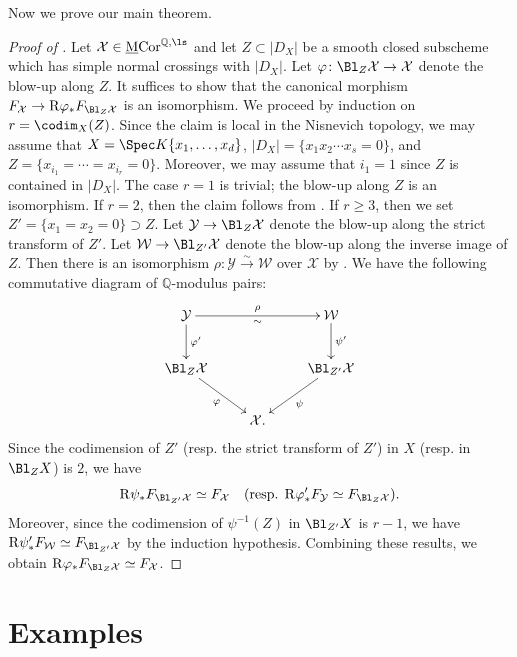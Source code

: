 \documentclass{amsart}
\theoremstyle{plain}
\theoremstyle{definition}
\theoremstyle{remark}
\numberwithin{equation}{section}
\def\MCor{\mathrm{\underline{M}Cor}}
\begin{document}
Now we prove our main theorem.

\begin{proof}[Proof of ]
	Let $\mathcal{X}\in \MCor^{\mathbb{Q},\ls}$ and let $Z\subset|D_X|$ be a smooth closed subscheme which has simple normal crossings with $|D_X|$.
    Let $\varphi\colon \Bl_Z\mathcal{X}\to \mathcal{X}$ denote the blow-up along $Z$.
    It suffices to show that the canonical morphism $F_\mathcal{X}\to \mathrm{R}\varphi_*F_{\Bl_Z\mathcal{X}}$ is an isomorphism.
    We proceed by induction on $r=\codim_X(Z)$.
    Since the claim is local in the Nisnevich topology, we may assume that $X=\Spec K\{x_1,\dots,x_d\}$, $|D_X|=\{x_1x_2\cdots x_s=0\}$, and $Z=\{x_{i_1}=\cdots=x_{i_r}=0\}$.
    Moreover, we may assume that $i_1=1$ since $Z$ is contained in $|D_X|$.
    The case $r=1$ is trivial; the blow-up along $Z$ is an isomorphism.
    If $r=2$, then the claim follows from .
    If $r\geq 3$, then we set $Z'=\{x_1=x_2=0\}\supset Z$.
    Let $\mathcal{Y}\to \Bl_Z\mathcal{X}$ denote the blow-up along the strict transform of $Z'$.
    Let $\mathcal{W}\to \Bl_{Z'}\mathcal{X}$ denote the blow-up along the inverse image of $Z$.
    Then there is an isomorphism $\rho\colon \mathcal{Y} \xrightarrow{\sim} \mathcal{W}$ over $\mathcal{X}$ by .
    We have the following commutative diagram of $\mathbb{Q}$-modulus pairs:
    $$
    \xymatrix{
        \mathcal{Y}\ar[rr]^-{\rho}_-{\sim}\ar[d]^-{\varphi'}       &&\mathcal{W}\ar[d]^-{\psi'}\\
        \Bl_Z\mathcal{X}\ar[rd]_-\varphi          &&\Bl_{Z'}\mathcal{X}\ar[ld]^-\psi\\
        &\mathcal{X}.
    }
    $$
    Since the codimension of $Z'$ (resp. the strict transform of $Z'$) in $X$ (resp. in $\Bl_ZX$) is $2$, we have
    $$
        \mathrm{R}\psi_*F_{\Bl_{Z'}\mathcal{X}}\simeq F_\mathcal{X}\quad
        \text{(resp. }
        \mathrm{R}\varphi'_*F_\mathcal{Y}\simeq F_{\Bl_Z\mathcal{X}}
        \text{).}
    $$
    Moreover, since the codimension of $\psi^{-1}(Z)$ in $\Bl_{Z'}X$ is $r-1$, we have
    $\mathrm{R}\psi'_*F_{\mathcal{W}}\simeq F_{\Bl_{Z'}\mathcal{X}}$
    by the induction hypothesis.
    Combining these results, we obtain $\mathrm{R}\varphi_*F_{\Bl_Z\mathcal{X}}\simeq F_\mathcal{X}$.
\end{proof}





\section{Examples}
\end{document}
